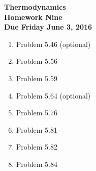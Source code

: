 \documentclass[12pt]{article}
\begin{document}
\pagestyle{empty}
 
\begin{center}
{\large {\bf Thermodynamics}}\\
\medskip
{\large {\bf Homework Nine}}\\
\medskip
{ {\bf Due Friday June 3, 2016}}\\
\end{center}
\bigskip
\begin{enumerate}

  \item Problem 5.46 (optional)
  \item Problem 5.56 
  \item Problem 5.59
  \item Problem 5.64 (optional)
  \item Problem 5.76
  \item Problem 5.81
  \item Problem 5.82
  \item Problem 5.84

\end{enumerate}
\end{document}
